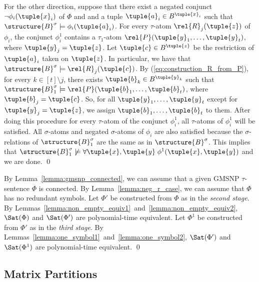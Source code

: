 \documentclass{lmcs}
\begin{document}
For the other direction, suppose that there exist a negated conjunct $\neg\phi_i(\tuple{x}_i)$ of $\Phi$ and and a tuple $\tuple{a}_i\in B^{\tuple{x}_i}$ such that $\structure{B}^\sigma\models\phi_i (\tuple{a}_i)$.
For every $\tau$-atom $\rel{R}_j(\tuple{z})$ of $\phi_i$, the conjunct $\phi_i^1$ contains a $\tau_1$-atom $\rel{P}(\tuple{y}_1,\ldots,\tuple{y}_t)$, where $\tuple{y}_j=\tuple{z}$.
Let $\tuple{c}\in B^{\tuple{z}}$ be the restriction of $\tuple{a}_i$ taken on $\tuple{z}$.
In particular, we have that $\structure{B}^\sigma\models\rel{R}_j(\tuple{c})$.
By (\ref{eq:construction_R_from_P}), for every $k\in[t]\setminus j$, there exists $\tuple{b}_k\in B^{\tuple{y}_k}$ such that $\structure{B}_1^\sigma\models\rel{P}(\tuple{b}_1,\ldots,\tuple{b}_t)$, where $\tuple{b}_j=\tuple{c}$.
So, for all $\tuple{y}_1,\ldots,\tuple{y}_t$ except for $\tuple{y}_j=\tuple{z}$, we assign $\tuple{b}_1,\ldots,\tuple{b}_t$ to them.
After doing this procedure for every $\tau$-atom of the conjunct $\phi_i^1$, all $\tau$-atoms of $\phi_i^1$ will be satisfied.
All $\sigma$-atoms and negated $\sigma$-atoms of $\phi_i$ are also satisfied because the $\sigma$-relations of $\structure{B}_1^\sigma$ are the same as in $\structure{B}^\sigma$.
This implies that $\structure{B}_1^\sigma\not\models\forall\tuple{x},\tuple{y}\;\phi^1(\tuple{x},\tuple{y})$ and we are done.
\qed


By Lemma~\ref{lemma:gmsnp_connected}, we can assume that a given GMSNP $\tau$-sentence $\Phi$ is connected.
%
By Lemma~\ref{lemma:neg_r_case}, we can assume that $\Phi$ has no redundant symbols.
%
Let $\Phi'$ be constructed from $\Phi$ as in the \emph{second stage}.
%
By Lemmas~\ref{lemma:non_empty_equiv1}~and~\ref{lemma:non_empty_equiv2}, $\Sat(\Phi)$ and $\Sat(\Phi')$ are polynomial-time equivalent.
%
Let $\Phi^1$ be constructed from $\Phi'$ as in the \emph{third stage}.
%
By Lemmas~\ref{lemma:one_symbol1}~and~\ref{lemma:one_symbol2}, $\Sat(\Phi')$ and $\Sat(\Phi^1)$ are polynomial-time equivalent.
\qed
















\subsection{Matrix Partitions}\label{section:mp}
\end{document}
